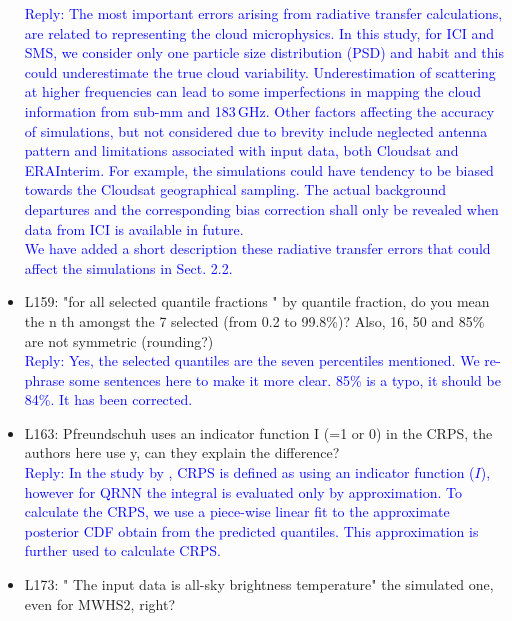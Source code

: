 \documentclass[11pt,a4paper,draft]{article}
\begin{document}
\begin{itemize}
\textcolor{blue}{Reply: The most important errors arising from radiative transfer calculations, are related to representing the cloud microphysics. In this study, for ICI and SMS, we consider only one particle size distribution (PSD) and habit and this could underestimate the true cloud variability. Underestimation of scattering at higher frequencies can lead to some imperfections in mapping the cloud information from sub-mm and 183\,GHz. Other factors affecting the accuracy of simulations, but not considered due to brevity include neglected antenna pattern and limitations associated with input data, both Cloudsat and ERAInterim. For example, the simulations could have tendency to be biased towards the Cloudsat geographical sampling. The actual background departures and the corresponding bias correction shall only be revealed when data from ICI is available in future.\\
We have added a short description these radiative transfer errors that could affect the simulations in Sect. 2.2.  } \\
		
	
		
\item	
		L159: "for all selected quantile fractions " by quantile fraction, do you mean the n th
		amongst the 7 selected (from 0.2 to 99.8\%)? Also, 16, 50 and 85\% are not symmetric
		(rounding?)\\
		
\textcolor{blue}{Reply: Yes, the selected quantiles are the seven percentiles mentioned. We re-phrase some sentences here to make it more clear. 85\% is a typo, it should be 84\%. It has been corrected.}\\
		
		
\item	
		L163: Pfreundschuh uses an indicator function I (=1 or 0) in the CRPS, the authors
		here use y, can they explain the difference?\\
		
\textcolor{blue}{Reply: In the study by \citet{pfreundschuh:aneur:18}, CRPS is defined as using an indicator function ($I$), however for QRNN the integral is evaluated only by approximation. To calculate the CRPS, we use a piece-wise linear fit to the approximate posterior CDF obtain from the predicted quantiles. This approximation is further used to calculate CRPS.}\\
		
		
\item	
		L173: " The input data is all-sky brightness temperature" the simulated one, even for
		MWHS2, right? \\
		

\end{itemize}
\end{document}
